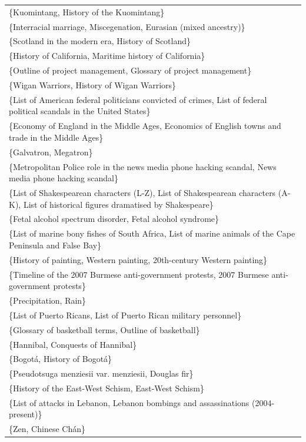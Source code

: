 \documentclass{acm_proc_article-sp}
\begin{document}
\begin{table}
{\begin{tabular}{| l |}
\{Kuomintang, History of the Kuomintang\} \\
\{Interracial marriage, Miscegenation, Eurasian (mixed ancestry)\} \\
\{Scotland in the modern era, History of Scotland\} \\
\{History of California, Maritime history of California\} \\
\{Outline of project management, Glossary of project management\} \\
\{Wigan Warriors, History of Wigan Warriors\} \\
\{List of American federal politicians convicted of crimes, List of federal political scandals in the United States\} \\
\{Economy of England in the Middle Ages, Economics of English towns and trade in the Middle Ages\} \\
\{Galvatron, Megatron\} \\
\{Metropolitan Police role in the news media phone hacking scandal, News media phone hacking scandal\} \\
\{List of Shakespearean characters (L-Z), List of Shakespearean characters (A-K), List of historical figures dramatised by Shakespeare\} \\
\{Fetal alcohol spectrum disorder, Fetal alcohol syndrome\} \\
\{List of marine bony fishes of South Africa, List of marine animals of the Cape Peninsula and False Bay\} \\
\{History of painting, Western painting, 20th-century Western painting\} \\
\{Timeline of the 2007 Burmese anti-government protests, 2007 Burmese anti-government protests\} \\
\{Precipitation, Rain\} \\
\{List of Puerto Ricans, List of Puerto Rican military personnel\} \\
\{Glossary of basketball terms, Outline of basketball\} \\
\{Hannibal, Conquests of Hannibal\} \\
\{Bogotá, History of Bogotá\} \\
\{Pseudotsuga menziesii var. menziesii, Douglas fir\} \\
\{History of the East-West Schism, East-West Schism\} \\
\{List of attacks in Lebanon, Lebanon bombings and assassinations (2004-present)\} \\
\{Zen, Chinese Chán\} \\

\end{tabular}}
\end{table}
\end{document}
